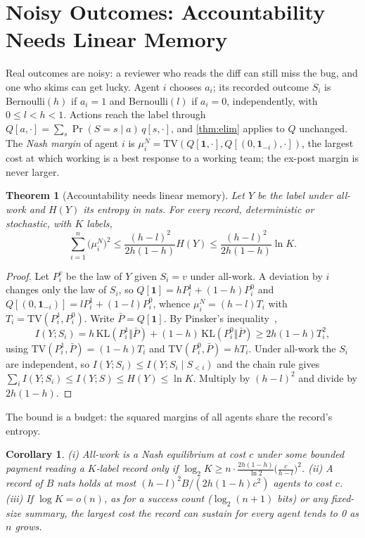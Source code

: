 \documentclass[sigconf,anonymous,acmthm=false]{acmart}
\theoremstyle{acmplain}
\newtheorem{theorem}{Theorem}
\newtheorem{corollary}{Corollary}
\theoremstyle{acmdefinition}
\newcommand{\TV}{\mathrm{TV}}
\begin{document}
\section{Noisy Outcomes: Accountability Needs Linear Memory}\label{sec:noisy}

Real outcomes are noisy: a reviewer who reads the diff can still miss the bug, and one who
skims can get lucky. Agent $i$ chooses $a_i$; its recorded outcome $S_i$ is Bernoulli$(h)$ if
$a_i=1$ and Bernoulli$(l)$ if $a_i=0$, independently, with $0\le l<h<1$. Actions reach the
label through $Q[a,\cdot]=\sum_s\Pr(S=s\mid a)\,q[s,\cdot]$, and \cref{thm:elim} applies to
$Q$ unchanged. The \emph{Nash margin} of agent $i$ is
$\mu_i^N=\TV(Q[\mathbf1,\cdot],Q[(0,\mathbf1_{-i}),\cdot])$, the largest cost at which
working is a best response to a working team; the ex-post margin is never larger.

\begin{theorem}[Accountability needs linear memory]\label{thm:noisy}
Let $Y$ be the label under all-work and $H(Y)$ its entropy in nats. For every record,
deterministic or stochastic, with $K$ labels,
\[ \sum_{i=1}^n\big(\mu_i^N\big)^2\le\frac{(h-l)^2}{2h(1-h)}H(Y)\le\frac{(h-l)^2}{2h(1-h)}\ln K. \]
\end{theorem}

\begin{proof}
Let $P_i^v$ be the law of $Y$ given $S_i=v$ under all-work. A deviation by $i$ changes only
the law of $S_i$, so $Q[\mathbf1]=hP_i^1+(1-h)P_i^0$ and
$Q[(0,\mathbf1_{-i})]=lP_i^1+(1-l)P_i^0$, whence $\mu_i^N=(h-l)T_i$ with
$T_i=\TV(P_i^1,P_i^0)$. Write $\bar P=Q[\mathbf1]$. By Pinsker's inequality~\cite{cover2006},
\[ I(Y;S_i)=h\,\mathrm{KL}(P_i^1\Vert\bar P)+(1-h)\,\mathrm{KL}(P_i^0\Vert\bar P)\ge2h(1-h)T_i^2, \]
using $\TV(P_i^1,\bar P)=(1-h)T_i$ and $\TV(P_i^0,\bar P)=hT_i$. Under all-work the $S_i$ are
independent, so $I(Y;S_i)\le I(Y;S_i\mid S_{<i})$ and the chain rule gives
$\sum_iI(Y;S_i)\le I(Y;S)\le H(Y)\le\ln K$. Multiply by $(h-l)^2$ and divide by $2h(1-h)$.
\end{proof}

The bound is a budget: the squared margins of all agents share the record's entropy.

\begin{corollary}\label{cor:noisy}
(i) All-work is a Nash equilibrium at cost $c$ under some bounded payment reading a $K$-label
record only if $\log_2K\ge n\cdot\frac{2h(1-h)}{\ln2}\big(\frac c{h-l}\big)^2$. (ii) A record
of $B$ nats holds at most $(h-l)^2B/(2h(1-h)c^2)$ agents to cost $c$. (iii) If $\log K=o(n)$,
as for a success count ($\log_2(n+1)$ bits) or any fixed-size summary, the largest cost the
record can sustain for every agent tends to 0 as $n$ grows.
\end{corollary}
\end{document}
